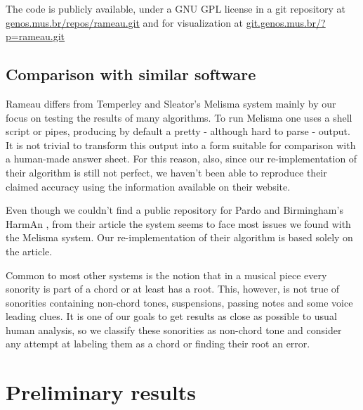 \documentclass{article}
\begin{document}
The code is publicly available, under a GNU GPL \cite{fsf:gpl} license
in a git \cite{baudis:_git_users_manual} repository at
\url{genos.mus.br/repos/rameau.git} and for visualization at
\url{git.genos.mus.br/?p=rameau.git}

\subsection{Comparison with similar software}
\label{sec:differences-from-similar-software}

Rameau differs from Temperley and Sleator's Melisma
\cite{temperley99:modeling} system mainly by our focus on testing the
results of many algorithms. To run Melisma one uses a shell script or
pipes, producing by default a pretty - although hard to parse -
output. It is not trivial to transform this output into a form
suitable for comparison with a human-made answer sheet. For this
reason, also, since our re-implementation of their algorithm is still
not perfect, we haven't been able to reproduce their claimed accuracy
using the information available on their website.

Even though we couldn't find a public repository for Pardo and
Birmingham's HarmAn \cite{pardo99:automated}, from their article the
system seems to face most issues we found with the Melisma system. Our
re-implementation of their algorithm is based solely on the article.

Common to most other systems is the notion that in a musical piece
every sonority is part of a chord or at least has a root. This,
however, is not true of sonorities containing non-chord tones,
suspensions, passing notes and some voice leading clues. It is one of
our goals to get results as close as possible to usual human analysis,
so we classify these sonorities as non-chord tone and consider any
attempt at labeling them as a chord or finding their root an error.

\section{Preliminary results}
\label{sec:analysis-results}
\end{document}
